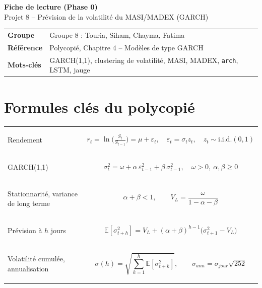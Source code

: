 \documentclass[10pt,a4paper]{article}
\begin{document}
\begin{tcolorbox}[colback=main,colframe=main,coltext=white,arc=3pt,halign=center]
{\Large\bfseries Fiche de lecture (Phase 0)}\\[2pt]
{\large Projet 8 -- Prévision de la volatilité du MASI/MADEX (GARCH)}
\end{tcolorbox}

\begin{tabularx}{\linewidth}{@{}>{\bfseries}l X@{}}
\toprule
Groupe & Groupe 8 : Touria, Siham, Chayma, Fatima \\
Référence & Polycopié, Chapitre 4 -- Modèles de type GARCH \\
Mots-clés & GARCH(1,1), clustering de volatilité, MASI, MADEX, \texttt{arch}, LSTM, jauge \\
\bottomrule
\end{tabularx}

\section{Formules clés du polycopié}

\begin{tabularx}{\linewidth}{@{}>{\bfseries\raggedright}p{3.3cm} X@{}}
Rendement &
\begin{formule}\vspace{-4pt}
\[ r_t=\ln\!\Big(\tfrac{S_t}{S_{t-1}}\Big)=\mu+\varepsilon_t,\quad \varepsilon_t=\sigma_t z_t,\quad z_t\sim\text{i.i.d.}(0,1) \]
\vspace{-12pt}\end{formule}\\
GARCH(1,1) &
\begin{formule}\vspace{-4pt}
\[ \sigma_t^2=\omega+\alpha\,\varepsilon_{t-1}^2+\beta\,\sigma_{t-1}^2,\quad \omega>0,\ \alpha,\beta\ge0 \]
\vspace{-12pt}\end{formule}\\
Stationnarité, variance de long terme &
\begin{formule}\vspace{-4pt}
\[ \alpha+\beta<1,\qquad V_L=\frac{\omega}{1-\alpha-\beta} \]
\vspace{-12pt}\end{formule}\\
Prévision à $h$ jours &
\begin{formule}\vspace{-4pt}
\[ \mathbb{E}[\sigma_{t+h}^2]=V_L+(\alpha+\beta)^{h-1}\big(\sigma_{t+1}^2-V_L\big) \]
\vspace{-12pt}\end{formule}\\
Volatilité cumulée, annualisation &
\begin{formule}\vspace{-4pt}
\[ \sigma(h)=\sqrt{\textstyle\sum_{k=1}^{h}\mathbb{E}[\sigma_{t+k}^2]},\qquad \sigma_{ann}=\sigma_{jour}\sqrt{252} \]
\vspace{-12pt}\end{formule}\\
\end{tabularx}
\end{document}
